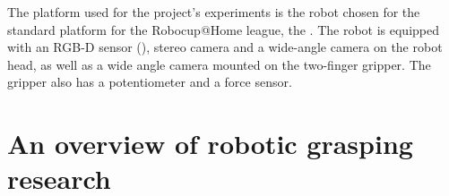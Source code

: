 The platform used for the project's experiments is the robot chosen for the standard platform for the Robocup@Home
league, the
\cite{robocupRulebook2018}. The robot is equipped with an RGB-D sensor
(), stereo camera and a wide-angle camera
on the robot head, as well as a wide angle camera mounted on the two-finger gripper. The gripper also has a
potentiometer and a force sensor.


\section{An overview of robotic grasping research} \label{sub:overview}

